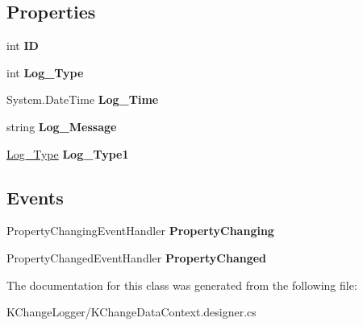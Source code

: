 \subsection*{Properties}
\begin{DoxyCompactItemize}
\item 
\hypertarget{class_k_change_logger_1_1_log_a48f244a7fdbecfcab35d3550c8af8eb1}{int {\bfseries I\-D}}\label{class_k_change_logger_1_1_log_a48f244a7fdbecfcab35d3550c8af8eb1}

\item 
\hypertarget{class_k_change_logger_1_1_log_af55d9b42bc9e7a787e94205b3430cdbc}{int {\bfseries Log\-\_\-\-Type}}\label{class_k_change_logger_1_1_log_af55d9b42bc9e7a787e94205b3430cdbc}

\item 
\hypertarget{class_k_change_logger_1_1_log_ab93c6eaf4bd8320dd48f1c5199c1c71a}{System.\-Date\-Time {\bfseries Log\-\_\-\-Time}}\label{class_k_change_logger_1_1_log_ab93c6eaf4bd8320dd48f1c5199c1c71a}

\item 
\hypertarget{class_k_change_logger_1_1_log_a4830e61c9f6116826eb3e76e18428263}{string {\bfseries Log\-\_\-\-Message}}\label{class_k_change_logger_1_1_log_a4830e61c9f6116826eb3e76e18428263}

\item 
\hypertarget{class_k_change_logger_1_1_log_a5cca73fad837daa4f182dd844a2cc4b8}{\hyperlink{class_k_change_logger_1_1_log___type}{Log\-\_\-\-Type} {\bfseries Log\-\_\-\-Type1}}\label{class_k_change_logger_1_1_log_a5cca73fad837daa4f182dd844a2cc4b8}

\end{DoxyCompactItemize}
\subsection*{Events}
\begin{DoxyCompactItemize}
\item 
\hypertarget{class_k_change_logger_1_1_log_ad296b5bb9d0f1610b700dc1ca0a47749}{Property\-Changing\-Event\-Handler {\bfseries Property\-Changing}}\label{class_k_change_logger_1_1_log_ad296b5bb9d0f1610b700dc1ca0a47749}

\item 
\hypertarget{class_k_change_logger_1_1_log_a276356351a593610fea04e4e1b8be204}{Property\-Changed\-Event\-Handler {\bfseries Property\-Changed}}\label{class_k_change_logger_1_1_log_a276356351a593610fea04e4e1b8be204}

\end{DoxyCompactItemize}


The documentation for this class was generated from the following file\-:\begin{DoxyCompactItemize}
\item 
K\-Change\-Logger/K\-Change\-Data\-Context.\-designer.\-cs\end{DoxyCompactItemize}
